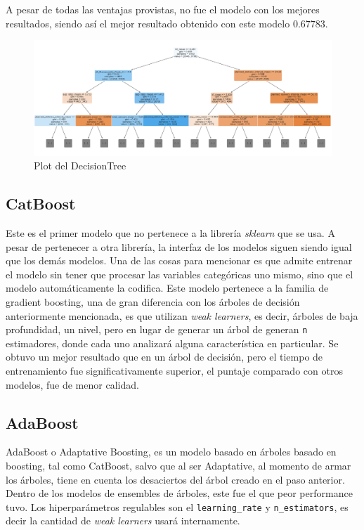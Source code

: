 \documentclass[titlepage,a4paper]{article}
\begin{document}
A pesar de todas las ventajas provistas, no fue el modelo con los mejores resultados, siendo así el mejor resultado obtenido con este modelo $0.67783$.

\begin{figure}[H]
\centering
\includegraphics[width=1.1\textwidth]{images/des_tree_plot.png}
\cprotect\caption{\label{fig:plot_tree} Plot del DecisionTree}
\end{figure}


\subsection{CatBoost}\label{sub:cat_boost}
Este es el primer modelo que no pertenece a la librería \textit{sklearn} que se usa. A pesar de pertenecer a otra librería, la interfaz de los modelos siguen siendo igual que los demás modelos. Una de las cosas para mencionar es que admite entrenar el modelo sin tener que procesar las variables categóricas uno mismo, sino que el modelo automáticamente la codifica. Este modelo pertenece a la familia de gradient boosting, una de gran diferencia con los árboles de decisión anteriormente mencionada, es que utilizan \textit{weak learners}, es decir, árboles de baja profundidad, un nivel, pero en lugar de generar un árbol de generan \verb|n| estimadores, donde cada uno analizará alguna característica en particular. Se obtuvo un mejor resultado que en un árbol de decisión, pero el tiempo de entrenamiento fue significativamente superior, el puntaje comparado con otros modelos, fue de menor calidad.


\subsection{AdaBoost}\label{sub:cat_boost}
AdaBoost o Adaptative Boosting, es un modelo basado en árboles basado en boosting, tal como CatBoost, salvo que al ser Adaptative, al momento de armar los árboles, tiene en cuenta los desaciertos del árbol creado en el paso anterior. Dentro de los modelos de ensembles de árboles, este fue el que peor performance tuvo. Los hiperparámetros regulables son el \verb|learning_rate| y \verb|n_estimators|, es decir la cantidad de \textit{weak learners} usará internamente.
\end{document}
